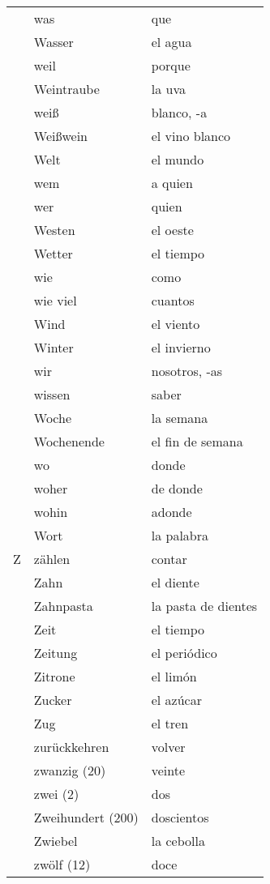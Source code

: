 \documentclass[10pt,spanish]{article}
\begin{document}
\begin{longtable}{p{} p{} | p{}}
& was & que  \\
& Wasser & el agua \\
& weil & porque  \\
& Weintraube & la uva \\
& weiß & blanco, -a  \\
& Weißwein & el vino blanco  \\
& Welt & el mundo \\
& wem & a quien  \\
& wer & quien  \\
& Westen & el oeste  \\
& Wetter & el tiempo  \\
& wie & como  \\
& wie viel& cuantos  \\
& Wind & el viento  \\
& Winter & el invierno  \\
& wir & nosotros, -as\\
& wissen & saber  \\
& Woche & la semana  \\
& Wochenende & el fin de semana  \\
& wo & donde  \\
& woher & de donde  \\
& wohin & adonde  \\
& Wort & la palabra \\
Z & zählen & contar  \\
& Zahn & el diente \\
& Zahnpasta & la pasta de dientes \\
& Zeit & el tiempo  \\
& Zeitung & el periódico  \\
& Zitrone & el limón \\
& Zucker & el azúcar  \\
& Zug & el tren  \\
& zurückkehren & volver  \\
& zwanzig (20) & veinte  \\
& zwei (2) & dos  \\
& Zweihundert (200) & doscientos  \\
& Zwiebel & la cebolla  \\
& zwölf (12) & doce \\
\end{longtable}
\end{document}
